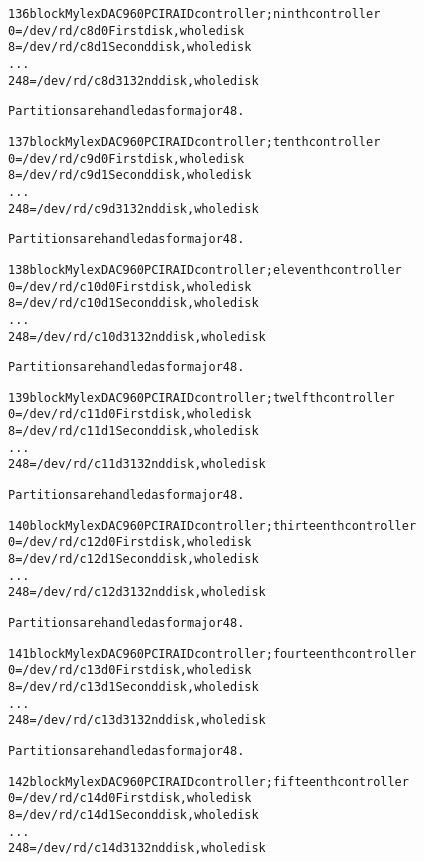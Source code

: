 \documentclass[a4paper,8pt,english]{sphinxmanual}
\begin{document}
\begin{alltt}
 136 block      Mylex DAC960 PCI RAID controller; ninth controller
                  0 = /dev/rd/c8d0      First disk, whole disk
                  8 = /dev/rd/c8d1      Second disk, whole disk
                    ...
                248 = /dev/rd/c8d31     32nd disk, whole disk

                Partitions are handled as for major 48.

 137 block      Mylex DAC960 PCI RAID controller; tenth controller
                  0 = /dev/rd/c9d0      First disk, whole disk
                  8 = /dev/rd/c9d1      Second disk, whole disk
                    ...
                248 = /dev/rd/c9d31     32nd disk, whole disk

                Partitions are handled as for major 48.

 138 block      Mylex DAC960 PCI RAID controller; eleventh controller
                  0 = /dev/rd/c10d0     First disk, whole disk
                  8 = /dev/rd/c10d1     Second disk, whole disk
                    ...
                248 = /dev/rd/c10d31    32nd disk, whole disk

                Partitions are handled as for major 48.

 139 block      Mylex DAC960 PCI RAID controller; twelfth controller
                  0 = /dev/rd/c11d0     First disk, whole disk
                  8 = /dev/rd/c11d1     Second disk, whole disk
                    ...
                248 = /dev/rd/c11d31    32nd disk, whole disk

                Partitions are handled as for major 48.

 140 block      Mylex DAC960 PCI RAID controller; thirteenth controller
                  0 = /dev/rd/c12d0     First disk, whole disk
                  8 = /dev/rd/c12d1     Second disk, whole disk
                    ...
                248 = /dev/rd/c12d31    32nd disk, whole disk

                Partitions are handled as for major 48.

 141 block      Mylex DAC960 PCI RAID controller; fourteenth controller
                  0 = /dev/rd/c13d0     First disk, whole disk
                  8 = /dev/rd/c13d1     Second disk, whole disk
                    ...
                248 = /dev/rd/c13d31    32nd disk, whole disk

                Partitions are handled as for major 48.

 142 block      Mylex DAC960 PCI RAID controller; fifteenth controller
                  0 = /dev/rd/c14d0     First disk, whole disk
                  8 = /dev/rd/c14d1     Second disk, whole disk
                    ...
                248 = /dev/rd/c14d31    32nd disk, whole disk


\end{alltt}
\end{document}
